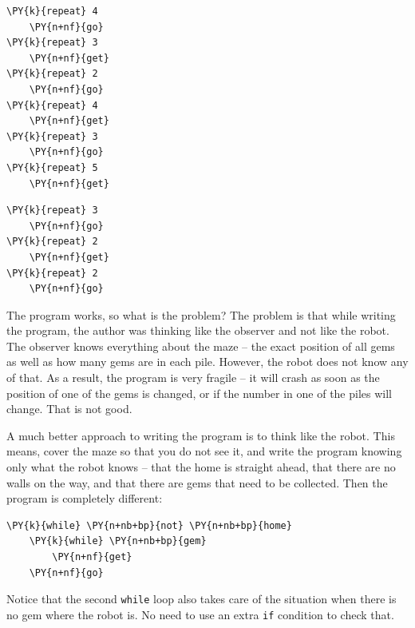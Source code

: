 \begin{bbox}
\begin{Verbatim}[commandchars=\\\{\}]
\PY{k}{repeat} 4
    \PY{n+nf}{go}
\PY{k}{repeat} 3
    \PY{n+nf}{get}
\PY{k}{repeat} 2
    \PY{n+nf}{go}
\PY{k}{repeat} 4
    \PY{n+nf}{get}
\PY{k}{repeat} 3
    \PY{n+nf}{go}
\PY{k}{repeat} 5
    \PY{n+nf}{get}
\end{Verbatim}
\end{bbox}

\begin{bbox}
\begin{Verbatim}[commandchars=\\\{\}]
\PY{k}{repeat} 3
    \PY{n+nf}{go}
\PY{k}{repeat} 2
    \PY{n+nf}{get}
\PY{k}{repeat} 2
    \PY{n+nf}{go}
\end{Verbatim}
\end{bbox}
\vspace{6mm}

\noindent
The program works, so what is the problem? The problem is that while writing the program, 
the author was thinking like the observer and not 
like the robot. The observer knows everything about the maze -- the exact position
of all gems as well as how many gems are in each pile. However, the robot does not know 
any of that. As a result, the program is very fragile -- it will crash as soon as
the position of one of the gems is changed, or if the number in one of the piles 
will change. That is not good. 

A much better approach to writing the program is to 
think like the robot. This means, cover the maze so that you do not see it, and 
write the program knowing only what the robot knows -- that the
home is straight ahead, that there are no walls on the way, and that there are 
gems that need to be collected. Then the program is completely different:\\

\begin{bbox}
\begin{Verbatim}[commandchars=\\\{\}]
\PY{k}{while} \PY{n+nb+bp}{not} \PY{n+nb+bp}{home}
    \PY{k}{while} \PY{n+nb+bp}{gem}
        \PY{n+nf}{get}
    \PY{n+nf}{go}
\end{Verbatim}
\end{bbox}
\vspace{6mm}

\noindent
Notice that the second {\tt while} loop also takes care of the situation 
when there is no gem where the robot is. No need to use an extra {\tt if}
condition to check that. 

